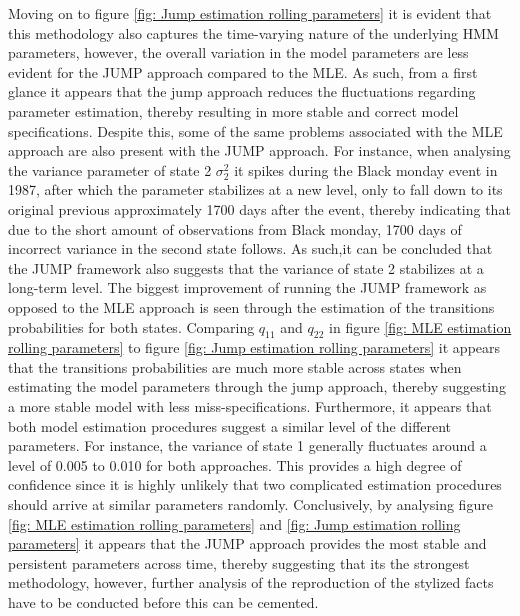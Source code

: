 Moving on to figure \ref{fig: Jump estimation rolling parameters} it is evident that this methodology also captures the time-varying nature of the underlying HMM parameters, however, the overall variation in the model parameters are less evident for the JUMP approach compared to the MLE. As such, from a first glance it appears that the jump approach reduces the fluctuations regarding parameter estimation, thereby resulting in more stable and correct model specifications. Despite this, some of the same problems associated with the MLE approach are also present with the JUMP approach. For instance, when analysing the variance parameter of state 2 $\sigma_2^2$ it spikes during the Black monday event in 1987, after which the parameter stabilizes at a new level, only to fall down to its original previous approximately 1700 days after the event, thereby indicating that due to the short amount of observations from Black monday, 1700 days of incorrect variance in the second state follows. As such,it can be concluded that the JUMP framework also suggests that the variance of state 2 stabilizes at a long-term level. The biggest improvement of running the JUMP framework as opposed to the MLE approach is seen through the estimation of the transitions probabilities for both states. Comparing $q_{11}$ and $q_{22}$ in figure \ref{fig: MLE estimation rolling parameters} to figure \ref{fig: Jump estimation rolling parameters} it appears that the transitions probabilities are much more stable across states when estimating the model parameters through the jump approach, thereby suggesting a more stable model with less miss-specifications. Furthermore, it appears that both model estimation procedures suggest a similar level of the different parameters. For instance, the variance of state 1 generally fluctuates around a level of 0.005 to 0.010 for both approaches. This provides a high degree of confidence since it is highly unlikely that two complicated estimation procedures should arrive at similar parameters randomly. Conclusively, by analysing figure \ref{fig: MLE estimation rolling parameters} and \ref{fig: Jump estimation rolling parameters} it appears that the JUMP approach provides the most stable and persistent parameters across time, thereby suggesting that its the strongest methodology, however, further analysis of the reproduction of the stylized facts have to be conducted before this can be cemented.

